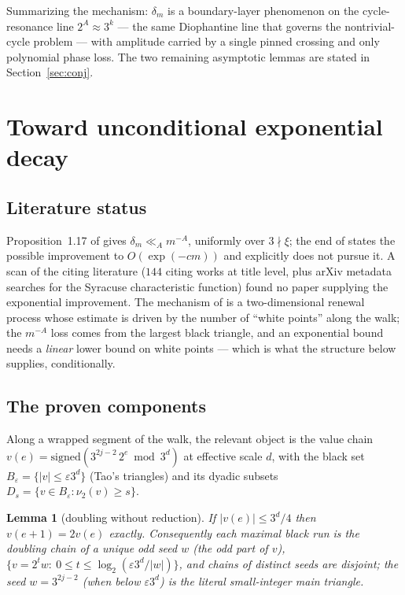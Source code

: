 \documentclass[11pt]{article}
\newtheorem{lemma}[theorem]{Lemma}
\theoremstyle{definition}
\begin{document}
Summarizing the mechanism: $\delta_m$ is a boundary-layer phenomenon on
the cycle-resonance line $2^{A}\approx 3^{k}$ --- the same Diophantine
line that governs the nontrivial-cycle problem --- with amplitude carried
by a single pinned crossing and only polynomial phase loss. The two
remaining asymptotic lemmas are stated in Section~\ref{sec:conj}.

\section{Toward unconditional exponential decay}
\label{sec:cond}

\subsection{Literature status}
Proposition~1.17 of \cite{Tao2022} gives $\delta_m\ll_A m^{-A}$,
uniformly over $3\nmid\xi$; the end of \cite[\S1.4]{Tao2022} states the
possible improvement to $O(\exp(-cm))$ and explicitly does not pursue
it. A scan of the citing literature ($144$ citing works at title level,
plus arXiv metadata searches for the Syracuse characteristic function)
found no paper supplying the exponential improvement. The mechanism of
\cite[\S7]{Tao2022} is a two-dimensional renewal process whose estimate
is driven by the number of ``white points'' along the walk; the
$m^{-A}$ loss comes from the largest black triangle, and an exponential
bound needs a \emph{linear} lower bound on white points --- which is
what the structure below supplies, conditionally.

\subsection{The proven components}
Along a wrapped segment of the walk, the relevant object is the value
chain $v(e)=\mathrm{signed}(3^{2j-2}\,2^{e} \bmod 3^d)$ at effective
scale $d$, with the black set $B_{\varepsilon}=\{|v|\le\varepsilon 3^d\}$
(Tao's triangles) and its dyadic subsets
$D_s=\{v\in B_{\varepsilon}:\nu_2(v)\ge s\}$.

\begin{lemma}[doubling without reduction]\label{lem:r1a}
If $|v(e)|\le 3^d/4$ then $v(e+1)=2v(e)$ exactly. Consequently each
maximal black run is the doubling chain of a unique odd seed $w$
(the odd part of $v$), $\{v=2^tw:\ 0\le t\le\log_2(\varepsilon 3^d/|w|)\}$,
and chains of distinct seeds are disjoint; the seed $w=3^{2j-2}$ (when
below $\varepsilon 3^d$) is the literal small-integer main triangle.
\end{lemma}
\end{document}
